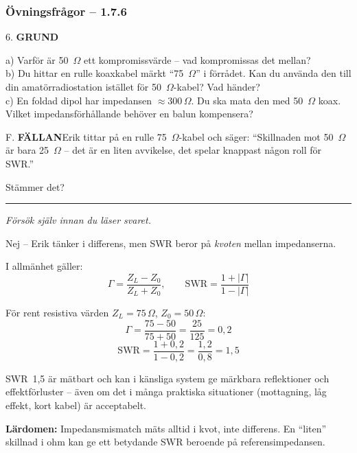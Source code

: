 \documentclass[a4paper,11pt,twoside]{book}
\newcommand{\qgrund}{\colorbox{greenpale}{\textcolor{greendark}{\headingfont\bfseries\tiny GRUND}}}
\newcommand{\qfallan}{\colorbox{ljusbrun}{\textcolor{kakao}{\headingfont\bfseries\tiny FÄLLAN}}}
\begin{document}
\subsubsection*{Övningsfrågor -- 1.7.6}

\begin{qblock}{6.}
\qgrund\quad

a) Varför är 50~$\Omega$ ett kompromissvärde --
vad kompromissas det mellan?\\
b) Du hittar en rulle koaxkabel märkt ``75~$\Omega$''
i förrådet. Kan du använda den till din
amatörradiostation istället för 50~$\Omega$-kabel?
Vad händer?\\
c) En foldad dipol har impedansen $\approx 300\,\Omega$.
Du ska mata den med 50~$\Omega$ koax.
Vilket impedansförhållande behöver en balun
kompensera?
\end{qblock}

\begin{qblock}{F.}
\qfallan\quad Erik tittar på en rulle 75~$\Omega$-kabel
och säger: ``Skillnaden mot 50~$\Omega$ är bara
25~$\Omega$ -- det är en liten avvikelse, det
spelar knappast någon roll för SWR.''

Stämmer det?
\end{qblock}

\medskip
\noindent\rule{\textwidth}{0.4pt}
{\small\itshape Försök själv innan du läser svaret.}
\medskip

\begin{worked}[title={Lösning -- Fallgropsfråga 1.7.6\,F}]
Nej -- Erik tänker i differens, men SWR beror på
\emph{kvoten} mellan impedanserna.

I allmänhet gäller:
\[
\Gamma=\frac{Z_L-Z_0}{Z_L+Z_0},
\qquad
\mathrm{SWR}=\frac{1+|\Gamma|}{1-|\Gamma|}
\]

För rent resistiva värden $Z_L=75\,\Omega$, $Z_0=50\,\Omega$:
\[
\Gamma=\frac{75-50}{75+50}=\frac{25}{125}=0{,}2
\]
\[
\mathrm{SWR}=\frac{1+0{,}2}{1-0{,}2}
=\frac{1{,}2}{0{,}8}=1{,}5
\]

SWR~1,5 är mätbart och kan i känsliga system ge
märkbara reflektioner och effektförluster -- även
om det i många praktiska situationer (mottagning,
låg effekt, kort kabel) är acceptabelt.

\textbf{Lärdomen:} Impedansmismatch mäts alltid i
kvot, inte differens. En ``liten'' skillnad i ohm
kan ge ett betydande SWR beroende på referensimpedansen.
\end{worked}



\end{document}
